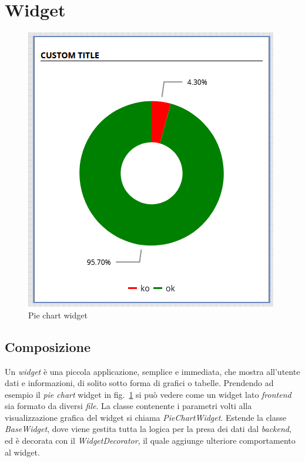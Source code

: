 \section{Widget}
\label{chap:widget}
\begin{figure}[h]

\centering
\includegraphics[scale=0.6]{images/widget_example.png}
\caption{Pie chart widget}
\label{fig:piechart}
\end{figure}
\subsection{Composizione}

Un \textit{widget} è una piccola applicazione, semplice e immediata, che mostra all'utente dati e informazioni, di solito sotto forma di grafici o tabelle. \newline Prendendo ad esempio il \textit{pie chart} widget in fig.~\ref{fig:piechart} si può vedere come un widget lato \textit{frontend} sia formato da diversi \textit{file}. La classe contenente i parametri volti alla visualizzazione grafica del widget si chiama \textit{PieChartWidget}. Estende la classe \textit{BaseWidget}, dove viene gestita tutta la logica per la presa dei dati dal \textit{backend}, ed è decorata con il \textit{WidgetDecorator}, il quale aggiunge ulteriore comportamento al widget.

